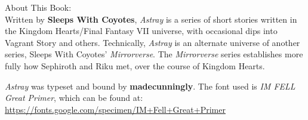 
\vspace*{\droptitle}
{\large About This Book:}\\[\baselineskip]

Written by \textbf{Sleeps With Coyotes}, \textit{Astray} is a series of short stories written in the Kingdom Hearts/Final Fantasy VII universe, with occasional dips into Vagrant Story and others. Technically, \textit{Astray} is an alternate universe of another series, Sleeps With Coyotes' \textit{Mirrorverse}. The \textit{Mirrorverse} series establishes more fully how Sephiroth and Riku met, over the course of Kingdom Hearts.  

\majorchange

\textit{Astray} was typeset and bound by \textbf{madecunningly}. 
The font used is \textit{IM FELL Great Primer}, which can be found at:\\ \url{https://fonts.google.com/specimen/IM+Fell+Great+Primer}
